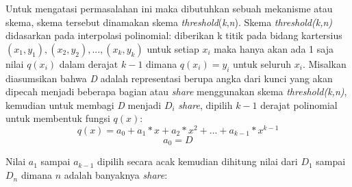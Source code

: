 Untuk mengatasi permasalahan ini maka dibutuhkan sebuah mekanisme atau skema, skema tersebut dinamakan skema \textit{threshold}(\textit{k},\textit{n}). Skema \textit{threshold(k,n)} didasarkan pada interpolasi polinomial: diberikan k titik pada bidang kartersius \begin{math}(x_1,y_1), (x_2, y_2), ...,(x_k, y_k)\end{math} untuk setiap \begin{math}x_i\end{math} maka hanya akan ada 1 saja nilai \begin{math}q(x_i)\end{math} dalam derajat \begin{math}k-1\end{math} dimana \begin{math}q(x_i)=y_i\end{math} untuk seluruh \begin{math}x_i\end{math}. Misalkan diasumsikan bahwa \textit{D} adalah representasi berupa angka dari kunci yang akan dipecah menjadi beberapa bagian atau \textit{share} menggunakan skema \textit{threshold(k,n)}, kemudian untuk membagi \textit{D} menjadi \begin{math}D_i\end{math} \textit{share}, dipilih \begin{math}k-1\end{math} derajat polinomial untuk membentuk fungsi \begin{math}q(x)\end{math}:
\begin{displaymath}
	q(x) = a_0 + a_1 * x + a_2 * x^2 + ... + a_{k-1} * x^{k-1}
\end{displaymath}
\begin{displaymath}
	a_0 = D
\end{displaymath}

Nilai \begin{math}a_1\end{math} sampai \begin{math}a_{k-1}\end{math} dipilih secara acak kemudian dihitung nilai dari \begin{math}D_1\end{math} sampai \begin{math}D_n\end{math} dimana \begin{math}n\end{math} adalah banyaknya \textit{share}:


